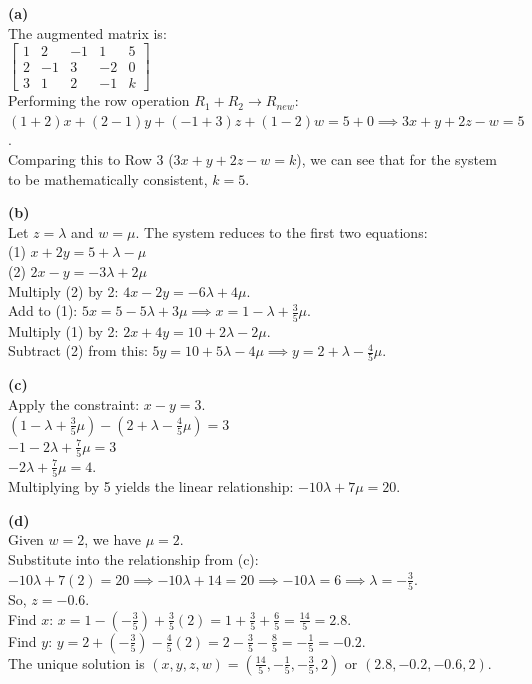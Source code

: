 \begin{solution}
\textbf{(a)} \\
The augmented matrix is: \\
$\left[\begin{array}{cccc|c} 1 & 2 & -1 & 1 & 5 \\ 2 & -1 & 3 & -2 & 0 \\ 3 & 1 & 2 & -1 & k \end{array}\right]$ \\
Performing the row operation $R_1 + R_2 \rightarrow R_{new}$: \\
$(1+2)x + (2-1)y + (-1+3)z + (1-2)w = 5 + 0 \implies 3x + y + 2z - w = 5$. \\
Comparing this to Row 3 ($3x + y + 2z - w = k$), we can see that for the system to be mathematically consistent, $k = 5$.

\medskip
\textbf{(b)} \\
Let $z = \lambda$ and $w = \mu$. The system reduces to the first two equations: \\
(1) $x + 2y = 5 + \lambda - \mu$ \\
(2) $2x - y = -3\lambda + 2\mu$ \\
Multiply (2) by 2: $4x - 2y = -6\lambda + 4\mu$. \\
Add to (1): $5x = 5 - 5\lambda + 3\mu \implies x = 1 - \lambda + \frac{3}{5}\mu$. \\
Multiply (1) by 2: $2x + 4y = 10 + 2\lambda - 2\mu$. \\
Subtract (2) from this: $5y = 10 + 5\lambda - 4\mu \implies y = 2 + \lambda - \frac{4}{5}\mu$.

\medskip
\textbf{(c)} \\
Apply the constraint: $x - y = 3$. \\
$\left(1 - \lambda + \frac{3}{5}\mu\right) - \left(2 + \lambda - \frac{4}{5}\mu\right) = 3$ \\
$-1 - 2\lambda + \frac{7}{5}\mu = 3$ \\
$-2\lambda + \frac{7}{5}\mu = 4$. \\
Multiplying by 5 yields the linear relationship: $-10\lambda + 7\mu = 20$.

\medskip
\textbf{(d)} \\
Given $w = 2$, we have $\mu = 2$. \\
Substitute into the relationship from (c): \\
$-10\lambda + 7(2) = 20 \implies -10\lambda + 14 = 20 \implies -10\lambda = 6 \implies \lambda = -\frac{3}{5}$. \\
So, $z = -0.6$. \\
Find $x$: $x = 1 - \left(-\frac{3}{5}\right) + \frac{3}{5}(2) = 1 + \frac{3}{5} + \frac{6}{5} = \frac{14}{5} = 2.8$. \\
Find $y$: $y = 2 + \left(-\frac{3}{5}\right) - \frac{4}{5}(2) = 2 - \frac{3}{5} - \frac{8}{5} = -\frac{1}{5} = -0.2$. \\
The unique solution is $(x, y, z, w) = \left(\frac{14}{5}, -\frac{1}{5}, -\frac{3}{5}, 2\right)$ or $(2.8, -0.2, -0.6, 2)$.
\end{solution}

